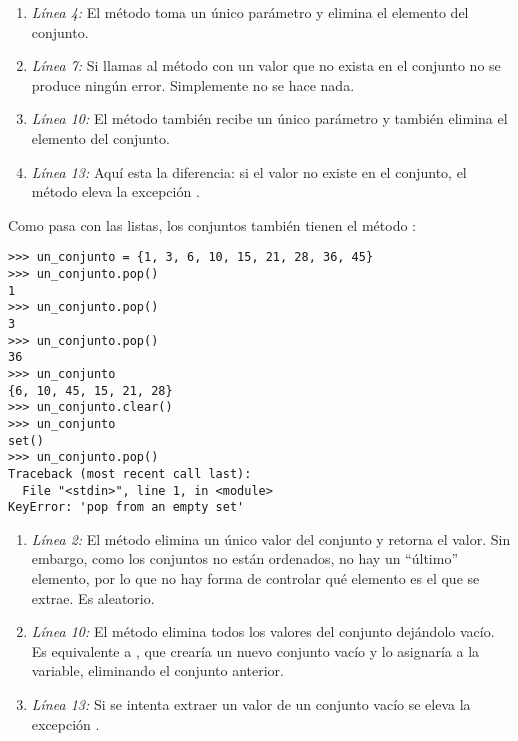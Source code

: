 \begin{enumerate}

\item \emph{Línea 4:} El método  toma un único parámetro y elimina el elemento del conjunto.

\item \emph{Línea 7:} Si llamas al método  con un valor que no exista en el conjunto no se produce ningún error. Simplemente no se hace nada.

\item \emph{Línea 10:} El método  también recibe un único parámetro y también elimina el elemento del conjunto.

\item \emph{Línea 13:} Aquí esta la diferencia: si el valor no existe en el conjunto, el método  eleva la excepción .

\end{enumerate}

Como pasa con las listas, los conjuntos también tienen el método :

\noindent\begin{minipage}{\textwidth}
\begin{lstlisting}[mathescape=True]
>>> un_conjunto = {1, 3, 6, 10, 15, 21, 28, 36, 45}
>>> un_conjunto.pop()
1
>>> un_conjunto.pop()
3
>>> un_conjunto.pop()
36
>>> un_conjunto
{6, 10, 45, 15, 21, 28}
>>> un_conjunto.clear()
>>> un_conjunto
set()
>>> un_conjunto.pop()
Traceback (most recent call last):
  File "<stdin>", line 1, in <module>
KeyError: 'pop from an empty set'
\end{lstlisting}
\end{minipage}

\begin{enumerate}

\item \emph{Línea 2:} El método  elimina un único valor del conjunto y retorna el valor. Sin embargo, como los conjuntos no están ordenados, no hay un ``último'' elemento, por lo que no hay forma de controlar qué elemento es el que se extrae. Es aleatorio.

\item \emph{Línea 10:} El método  elimina todos los valores del conjunto dejándolo vacío. Es equivalente a , que crearía un nuevo conjunto vacío y lo asignaría a la variable, eliminando el conjunto anterior.

\item \emph{Línea 13:} Si se intenta extraer un valor de un conjunto vacío se eleva la excepción . 

\end{enumerate}

